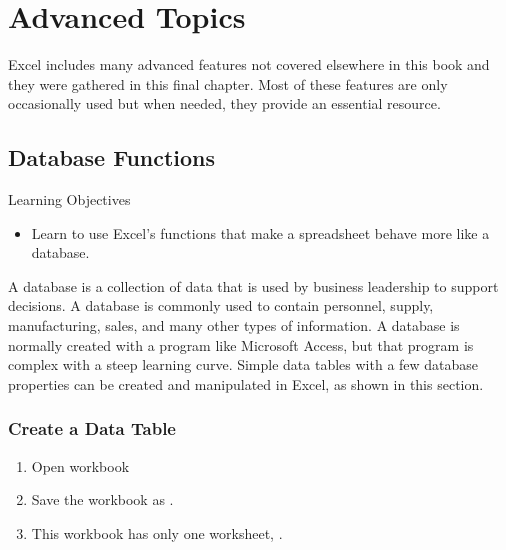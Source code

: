 \chapter{Advanced Topics}\label{ch09:topics}

Excel includes many advanced features not covered elsewhere in this book and they were gathered in this final chapter. Most of these features are only occasionally used but when needed, they provide an essential resource.

\section{Database Functions}

\begin{center}
	\begin{objbox}{Learning Objectives}
		\begin{itemize}
			\setlength{\itemsep}{0pt}
			\setlength{\parskip}{0pt}
			\setlength{\parsep}{0pt}
			
			\item Learn to use Excel's functions that make a spreadsheet behave more like a database.
		\end{itemize}
	\end{objbox}
\end{center}

A database is a collection of data that is used by business leadership to support decisions. A database is commonly used to contain personnel, supply, manufacturing, sales, and many other types of information. A database is normally created with a program like Microsoft Access, but that program is complex with a steep learning curve. Simple data tables with a few database properties can be created and manipulated in Excel, as shown in this section.

\subsection{Create a Data Table}

\begin{enumerate}
	\item Open workbook 
	\item Save the workbook as .
	\item This workbook has only one worksheet, .
\end{enumerate}

